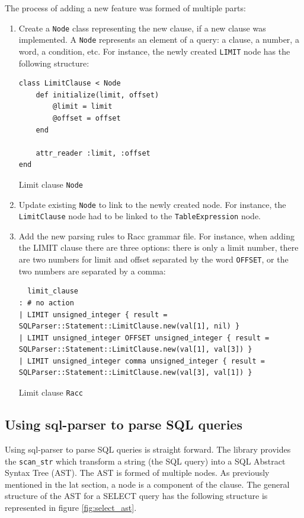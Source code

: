 The process of adding a new feature was formed of multiple parts:
\begin{enumerate}
    \item Create a \texttt{Node} class representing the new clause, if a new clause was implemented. A \texttt{Node} represents an element of a query: a clause, a number, a word, a condition, etc. For instance, the newly created \texttt{LIMIT} node has the following structure:
    \begin{listing}[H]\centering
\begin{verbatim}
class LimitClause < Node
    def initialize(limit, offset)
        @limit = limit
        @offset = offset
    end

    attr_reader :limit, :offset
end
\end{verbatim}
\caption{Limit clause \texttt{Node}}
\label{fig:limit_clause}
\end{listing}
    \item Update existing \texttt{Node} to link to the newly created node. For instance, the \texttt{LimitClause} node had to be linked to the \texttt{TableExpression} node.
    \item Add the new parsing rules to Racc grammar file. For instance, when adding the LIMIT clause there are three options: there is only a limit number, there are two numbers for limit and offset separated by the word \texttt{OFFSET}, or the two numbers are separated by a comma:
\begin{listing}[H]
    \centering
    \begin{verbatim}
  limit_clause
: # no action
| LIMIT unsigned_integer { result = SQLParser::Statement::LimitClause.new(val[1], nil) }
| LIMIT unsigned_integer OFFSET unsigned_integer { result = SQLParser::Statement::LimitClause.new(val[1], val[3]) }
| LIMIT unsigned_integer comma unsigned_integer { result = SQLParser::Statement::LimitClause.new(val[3], val[1]) }
    \end{verbatim}
    \caption{Limit clause \texttt{Racc}}
    \label{fig:limit_clause_racc}
\end{listing}
\end{enumerate}

\subsection{Using sql-parser to parse SQL queries}
Using sql-parser to parse SQL queries is straight forward. The library provides the \texttt{scan_str} which transform a string (the SQL query) into a SQL Abstract Syntax Tree (AST). The AST is formed of multiple nodes. As previously mentioned in the lat section, a node is a component of the clause. The general structure of the AST for a SELECT query has the following structure is represented in figure \ref{fig:select_ast}.

